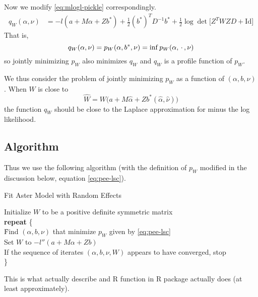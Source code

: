 Now we modify \eqref{eq:mlogl-pickle} correspondingly.
\begin{equation} \label{eq:queue}
\begin{split}
   q_W(\alpha, \nu)
   & =
   - l(a + M \alpha + Z b^*) + \tfrac{1}{2} (b^*)^T D^{-1} b^*
   + \tfrac{1}{2} \log \det \bigl[ Z^T W Z D + \text{Id} \bigr]
\end{split}
\end{equation}
That is,
\begin{equation*}
   q_W(\alpha, \nu) = p_W(\alpha, b^*, \nu) = \inf p_W(\alpha, \,\cdot\,, \nu)
\end{equation*}
so jointly minimizing $p_W$ also minimizes $q_W$ and $q_W$ is a profile
function of $p_W$.

We thus consider the problem of jointly
minimizing $p_W$ as a function of $(\alpha, b, \nu)$.
When $W$ is close to
\begin{equation} \label{eq:w-hat}
   \widehat{W} =
   W\bigl(a + M \hat{\alpha} + Z b^*(\hat{\alpha}, \hat{\nu})\bigr)
\end{equation}
the function $q_W$ should be close to the Laplace approximation for
minus the log likelihood.

\subsection{Algorithm}
\label{sec:algorithm}

Thus we use the following algorithm (with the definition of $p_W$ modified
in the discussion below, equation \eqref{eq:pee-lsc}).
\begin{algorithm}
\caption{Fit Aster Model with Random Effects}
\label{alg:reaster}
\begin{tabbing}
Initialize $W$ to be a positive definite symmetric matrix\\
\textbf{repeat} \{\\
\qquad \= Find $(\alpha, b, \nu)$ that minimize $p_W$ given by
    \eqref{eq:pee-lsc}\\
\> Set $W$ to $- l''(a + M \alpha + Z b)$\\
\> If the sequence of iterates $(\alpha, b, \nu, W)$ appears
    to have converged, stop\\
\}
\end{tabbing}
\end{algorithm}
This is what \citet{reaster} actually describe and
R function  in R package  \citep{aster-package}
actually does (at least approximately).

